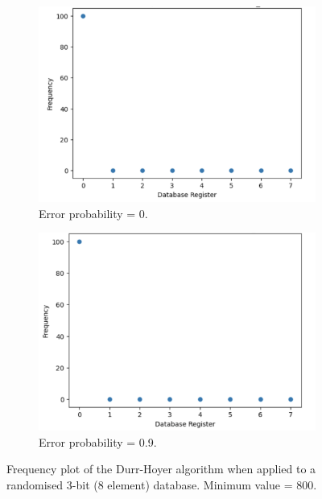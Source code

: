 \documentclass{article}[11pt]
\begin{document}
\begin{figure}[H]
\centering
\begin{subfigure}[t]{0.5\textwidth}
\centering
\includegraphics[width=\linewidth]{Pictures/errorp0.png}
\caption{Error probability = 0.}
\label{fig:errorp0}
\end{subfigure}%
\begin{subfigure}[t]{0.5\textwidth}
\centering
\includegraphics[width=\linewidth]{Pictures/errorp9.png}
\caption{ Error probability = 0.9.}
\label{fig:errorp9}
\end{subfigure}
\caption{Frequency plot of the Durr-Hoyer algorithm when applied to a randomised 3-bit (8 element) database. Minimum value = 800.}
\label{fig:durr_errors}
\end{figure}
\end{document}
